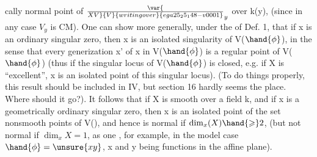 
cally normal point of $\var{\over{X}{V}}{V}{writing over}{ega25_25_148-v0001}_y$ over k(y), (since in any case  $V_y$ is CM).
One can show more generally, under the  of Def. 1, that if
x is an ordinary singular zero, then x is an isolated singularity
of V($\hand{\phi}$), in the sense that every generization  x' of x in V($\hand{\phi}$) is a
regular point of V($\hand{\phi}$) (thus if the singular locus of V($\hand{\phi}$) is closed, e.g.
if X is ``excellent'', x is  an isolated point of this singular
locus).  (To do things properly, this result should be included in 
IV, but section 16 hardly seems the place. Where should it go?). It
follows that if X is smooth over a field k, and if x is a geometrically
ordinary singular zero, then x is an isolated point of the set
 nonsmooth points of V(), and hence is  normal if $\dim_x(X) \hand{\geqslant} 2$,
(but  not normal if $\dim_x X = 1$, as one  , for example, in
the model case $\hand{\phi} = \unsure{xy}$, x and y being  functions in the affine plane).



